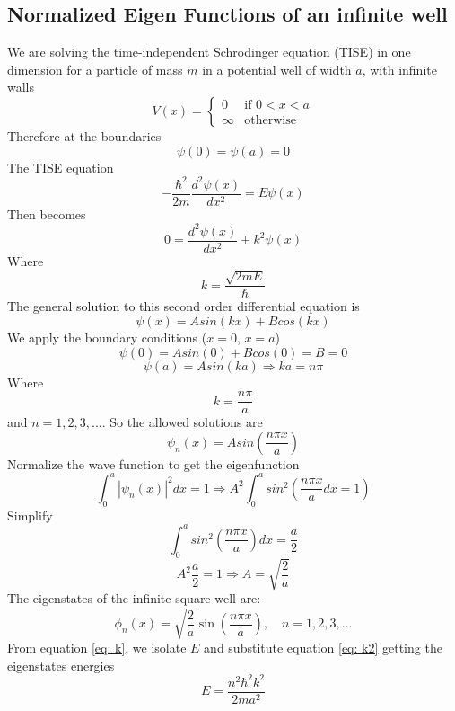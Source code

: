 \documentclass[12pt]{article}
\begin{document}
    \subsection{Normalized Eigen Functions of an infinite well} \label{app A}
        We are solving the time-independent Schrodinger equation (TISE) in one dimension for a particle of mass $m$ in a potential well of width $a$, with infinite walls
        \[
            V(x) = 
            \begin{cases}
            0 & \text{if } 0 < x < a \\
            \infty & \text{otherwise}
            \end{cases}
        \]
        Therefore at the boundaries
        \[
            \psi(0) = \psi(a) = 0
        \]
        The TISE equation 
        \[
            -\frac{\hbar^2}{2 m} \frac{d^2 \psi(x)}{dx^2} = E \psi(x)
        \]
        Then becomes
        \[
            0 = \frac{d^2 \psi(x)}{dx^2} + k^2 \psi(x)
        \]
        Where 
        \begin{equation} \label{eq: k}
            k = \frac{\sqrt{2 m E}}{\hbar}
        \end{equation}
        The general solution to this second order differential equation is 
        \[
            \psi(x) = A sin(kx) + B cos(kx)
        \]
        We apply the boundary conditions ($x=0$, $x=a$)
        \[
            \psi(0) = A sin(0) + B cos(0) = B = 0
        \]
        \[
            \psi(a) = A sin(ka) \Rightarrow ka=n\pi
        \]
        Where 
        \begin{equation} \label{eq: k2}
            k=\frac{n \pi}{a}    
        \end{equation}
        and $n=1,2,3,...$. So the allowed solutions are 
        \[
            \psi_n(x) = A sin(\frac{n \pi x}{a})
        \]
        Normalize the wave function to get the eigenfunction
        \[
            \int_0^a |\psi_n(x)|^2dx = 1 \Rightarrow A^2 \int_0^a sin^2 \left(\frac{n \pi x}{a} dx = 1 \right)
        \]
        Simplify
        \[
            \int_0^a sin^2 \left( \frac{n \pi x}{a} \right) dx = \frac{a}{2}
        \]
        \[
            A^2 \frac{a}{2} = 1 \Rightarrow A = \sqrt{\frac{2}{a}}
        \]
        The eigenstates of the infinite square well are:
        \[
            \phi_n(x) = \sqrt{\frac{2}{a}} \sin\left( \frac{n\pi x}{a} \right), \quad n=1,2,3,\ldots
        \]
        From equation \ref{eq: k}, we isolate $E$ and substitute equation \ref{eq: k2} getting the eigenstates energies
        \begin{equation} \label{eq: E}
            E = \frac{n^2 \hbar^2 k^2}{2 m a^2}
        \end{equation}


        
\end{document}
